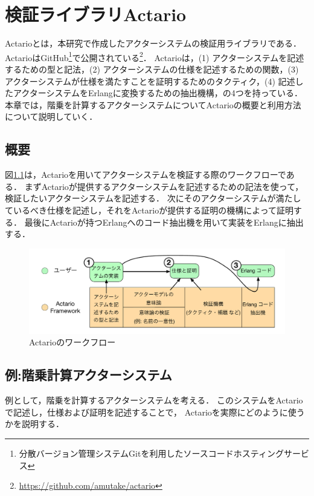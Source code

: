 \chapter{検証ライブラリActario}
\label{chapter:overview}

Actario\cite{Yasutake:2015aa}とは，本研究で作成したアクターシステムの検証用ライブラリである．
ActarioはGitHub\footnote{分散バージョン管理システムGitを利用したソースコードホスティングサービス}で公開されている\footnote{\url{https://github.com/amutake/actario}}．
Actarioは，(1) アクターシステムを記述するための型と記法，(2) アクターシステムの仕様を記述するための関数，(3) アクターシステムが仕様を満たすことを証明するためのタクティク，(4) 記述したアクターシステムをErlangに変換するための抽出機構，の4つを持っている．
本章では，階乗を計算するアクターシステムについてActarioの概要と利用方法について説明していく．

\section{概要}

図\ref{img:overview:workflow}は，Actarioを用いてアクターシステムを検証する際のワークフローである．
まずActarioが提供するアクターシステムを記述するための記法を使って，検証したいアクターシステムを記述する．
次にそのアクターシステムが満たしているべき仕様を記述し，それをActarioが提供する証明の機構によって証明する．
最後にActarioが持つErlangへのコード抽出機を用いて実装をErlangに抽出する．

\begin{figure}[tp]
  \centering
  \includegraphics[width=15cm]{./img/overview/workflow.pdf}
  \caption{Actarioのワークフロー}\label{img:overview:workflow}
\end{figure}

\section{例:階乗計算アクターシステム}

例として，階乗を計算するアクターシステムを考える．
このシステムをActarioで記述し，仕様および証明を記述することで，
Actarioを実際にどのように使うかを説明する．

